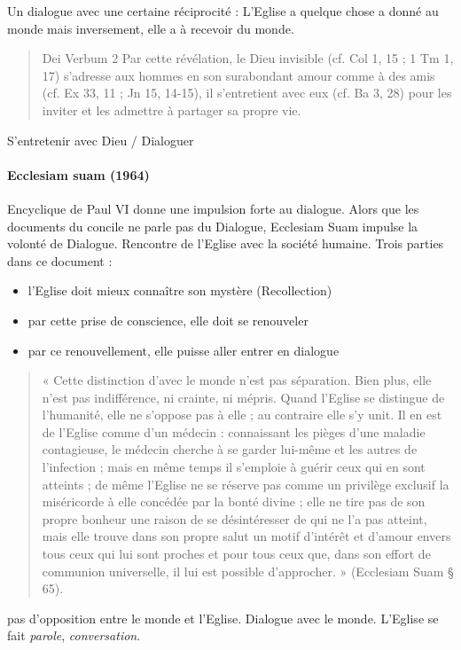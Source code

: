 Un dialogue avec une certaine réciprocité : L’Eglise a quelque chose a donné au monde mais inversement, elle a à recevoir du monde.
   
   \begin{quote}
       
Dei Verbum  2 Par cette révélation, le Dieu invisible (cf. Col 1, 15 ; 1 Tm 1, 17) s’adresse aux hommes en son surabondant amour comme à des amis (cf. Ex 33, 11 ; Jn 15, 14-15), il s’entretient avec eux (cf. Ba 3, 28) pour les inviter et les admettre à partager sa propre vie. 


   \end{quote}
    S’entretenir avec Dieu  / Dialoguer 

\paragraph{ Ecclesiam suam (1964)} 
   Encyclique de Paul VI donne une impulsion forte au dialogue. Alors que les documents du concile ne parle pas du Dialogue, Ecclesiam Suam impulse la volonté de Dialogue.
Rencontre de l’Eglise avec la société humaine.  Trois parties dans ce document : 
\begin{itemize}
    \item l’Eglise doit mieux connaître son mystère (Recollection)
\item par cette prise de conscience, elle doit se renouveler
\item par ce renouvellement, elle puisse aller entrer en dialogue
\end{itemize}

\begin{quote}
    
« Cette distinction d'avec le monde n'est pas séparation. Bien plus, elle n'est pas indifférence, ni crainte, ni mépris. Quand l'Eglise se distingue de l'humanité, elle ne s'oppose pas à elle ; au contraire elle s'y unit. Il en est de l'Eglise comme d'un médecin : connaissant les pièges d'une maladie contagieuse, le médecin cherche à se garder lui-même et les autres de l'infection ; mais en même temps il s'emploie à guérir ceux qui en sont atteints ; de même l'Eglise ne se réserve pas comme un privilège exclusif la miséricorde à elle concédée par la bonté divine ; elle ne tire pas de son propre bonheur une raison de se désintéresser de qui ne l'a pas atteint, mais elle trouve dans son propre salut un motif d'intérêt et d'amour envers tous ceux qui lui sont proches et pour tous ceux que, dans son effort de communion universelle, il lui est possible d'approcher. » (Ecclesiam Suam § 65). 


\end{quote}
pas d'opposition entre le monde et l'Eglise. Dialogue avec le monde. L'Eglise se fait \textit{parole}, \textit{conversation}.


